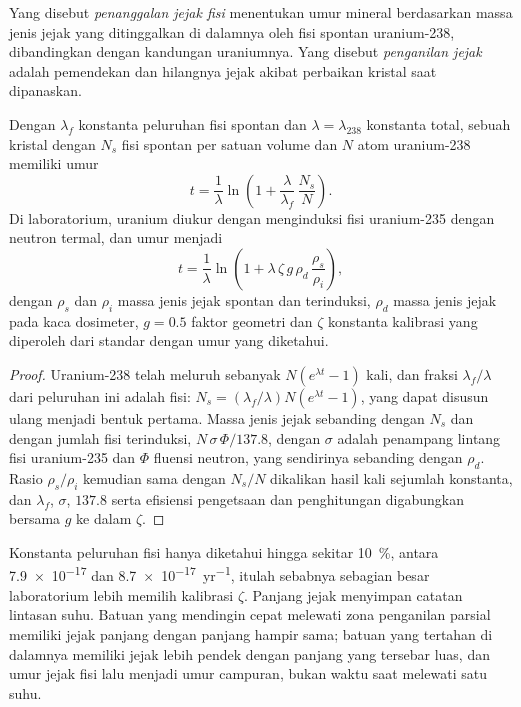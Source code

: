 \begin{definition}\label{def:b3:advanced-geochronology:fission-track}
Yang disebut \emph{penanggalan jejak fisi} menentukan umur mineral
berdasarkan massa jenis jejak yang ditinggalkan di dalamnya oleh fisi spontan
uranium-238, dibandingkan dengan kandungan uraniumnya. Yang disebut \emph{penganilan
jejak} adalah pemendekan dan hilangnya
jejak akibat perbaikan kristal saat dipanaskan.
\end{definition}

\begin{theorem}\label{thm:b3:advanced-geochronology:fission-track}
Dengan $\lambda_f$ konstanta peluruhan fisi spontan dan $\lambda =
\lambda_{238}$ konstanta total, sebuah kristal dengan $N_s$ fisi spontan per satuan
volume dan $N$ atom uranium-238 memiliki umur
\[
t = \frac1\lambda\ln\left(1 + \frac{\lambda}{\lambda_f}\,\frac{N_s}{N}\right).
\]
Di laboratorium, uranium diukur dengan menginduksi fisi
uranium-235 dengan neutron termal, dan umur menjadi
\[
t = \frac1\lambda\ln\left(1 + \lambda\,\zeta\,g\,\rho_d\,\frac{\rho_s}{\rho_i}\right),
\]
dengan $\rho_s$ dan $\rho_i$ massa jenis jejak spontan dan terinduksi,
$\rho_d$ massa jenis jejak pada kaca dosimeter, $g = 0.5$ faktor geometri
dan $\zeta$ konstanta kalibrasi yang diperoleh dari standar dengan umur yang diketahui.
\end{theorem}

\begin{proof}
Uranium-238 telah meluruh sebanyak $N(e^{\lambda t} - 1)$ kali, dan fraksi
$\lambda_f/\lambda$ dari peluruhan ini adalah fisi: $N_s =
(\lambda_f/\lambda)N(e^{\lambda t} - 1)$, yang dapat disusun ulang menjadi bentuk pertama.
Massa jenis jejak sebanding dengan $N_s$ dan dengan jumlah
fisi terinduksi, $N\,\sigma\,\Phi/137.8$, dengan $\sigma$ adalah penampang lintang fisi
uranium-235 dan $\Phi$ fluensi neutron, yang sendirinya
sebanding dengan $\rho_d$. Rasio $\rho_s/\rho_i$ kemudian sama dengan $N_s/N$ dikalikan
hasil kali sejumlah konstanta, dan $\lambda_f$, $\sigma$, $137.8$ serta efisiensi
pengetsaan dan penghitungan digabungkan bersama $g$ ke dalam $\zeta$.
\end{proof}

Konstanta peluruhan fisi hanya diketahui hingga sekitar \qty{10}{\percent},
antara \num{7.9e-17} dan \qty{8.7e-17}{yr^{-1}}, itulah sebabnya sebagian besar
laboratorium lebih memilih kalibrasi $\zeta$. Panjang jejak menyimpan
catatan lintasan suhu. Batuan yang mendingin cepat melewati
zona penganilan parsial memiliki jejak panjang dengan panjang hampir sama; batuan yang
tertahan di dalamnya memiliki jejak lebih pendek dengan panjang yang tersebar luas, dan
umur jejak fisi lalu menjadi umur campuran, bukan waktu saat melewati satu
suhu.

